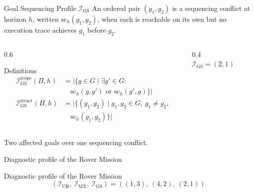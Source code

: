 \begin{frame}{Goal Sequencing Profile $\mathcal{I}_{\text{GS}}$}
    An ordered pair $(g_1, g_2)$ is a sequencing conflict at horizon $h$, written $\text{sc}_h(g_1, g_2)$, when each is reachable on its own but no execution trace achieves $g_1$ before $g_2$.

    \begin{columns}[T]
        \begin{column}{0.6\textwidth}
            \begin{block}{Definitions}
                \footnotesize
                \begin{align*}
                    \mathcal{I}^{\text{scope}}_{\text{GS}}(\Pi, h)  & = |\{g \in G \mid \exists g' \in G :                       \\
                                                                    & \quad \text{sc}_h(g, g') \text{ or } \text{sc}_h(g', g)\}| \\
                    \mathcal{I}^{\text{struct}}_{\text{GS}}(\Pi, h) & = |\{(g_1, g_2) \mid g_1, g_2 \in G,\ g_1 \neq g_2,        \\
                                                                    & \quad \text{sc}_h(g_1, g_2)\}|
                \end{align*}
            \end{block}
        \end{column}
        \begin{column}{0.4\textwidth}
            \centering
            \\[2pt]
            {\small $\mathcal{I}_{\text{GS}} = (2, 1)$}
        \end{column}
    \end{columns}

    Two affected goals over one sequencing conflict.

\end{frame}

\begin{frame}{Diagnostic profile of the Rover Mission}
    \begin{center}
        
    \end{center}

    \begin{exampleblock}{Diagnostic profile of the Rover Mission}
        \[
            (\mathcal{I}_{\text{UR}},\ \mathcal{I}_{\text{MX}},\ \mathcal{I}_{\text{GS}}) = ((1, 3),\ (4, 2),\ (2, 1))
        \]
    \end{exampleblock}

\end{frame}
